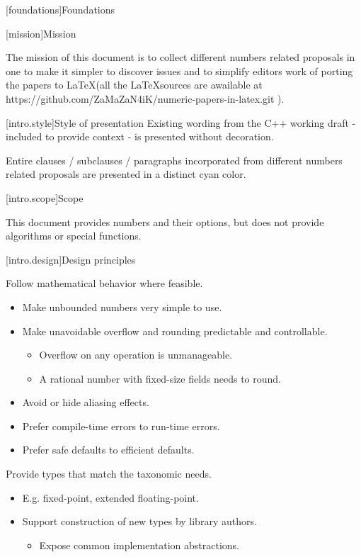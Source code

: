
[foundations]{Foundations}

[mission]{Mission}

\iffalse %
The mission of this specification is to make numbers easier to use.
\else
The mission of this document is to collect different numbers related proposals in one to make it simpler to discover issues and to simplify editors work of porting the papers to \LaTeX (all the \LaTeX sources are awailable at https://github.com/ZaMaZaN4iK/numeric-papers-in-latex.git ).
\fi

[intro.style]{Style of presentation}
Existing wording from the C++ working draft - included to provide context - is presented without decoration.

\begin{addedblock}
Entire clauses / subclauses / paragraphs incorporated from different numbers related proposals are presented in a distinct cyan
color.
\end{addedblock}

[intro.scope]{Scope}

This document provides numbers and their options, but does not provide algorithms or special functions.

[intro.design]{Design principles}

Follow mathematical behavior where feasible.

\begin{itemize}
\item Make unbounded numbers very simple to use.
\item Make unavoidable overflow and rounding predictable and controllable.
\begin{itemize}
\item Overflow on any operation is unmanageable.
\item A rational number with fixed-size fields needs to round.
\end{itemize}
\item Avoid or hide aliasing effects.
\item Prefer compile-time errors to run-time errors.
\item Prefer safe defaults to efficient defaults.
\end{itemize}

Provide types that match the taxonomic needs.

\begin{itemize}
\item E.g. fixed-point, extended floating-point.
\item Support construction of new types by library authors.
\begin{itemize}
\item Expose common implementation abstractions.
\end{itemize}	
\end{itemize}

